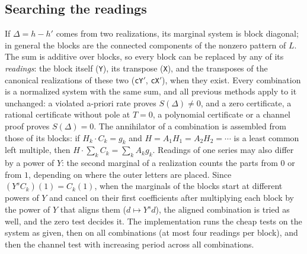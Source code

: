 \documentclass[11pt,a4paper]{article}
\theoremstyle{plain}
\theoremstyle{definition}
\theoremstyle{remark}
\begin{document}
\subsection{Searching the readings}\label{sec:search}
If $\Delta=h-h'$ comes from two realizations, its marginal system is block
diagonal; in general the blocks are the connected components of the nonzero
pattern of $L$. The sum is additive over blocks, so every block can be replaced
by any of its \emph{readings}: the block itself (\texttt{Y}), its transpose
(\texttt{X}), and the transposes of the canonical realizations of these two
(\texttt{cY$'$}, \texttt{cX$'$}), when they exist. Every combination is a
normalized system with the same sum, and all previous methods apply to it
unchanged: a violated a-priori rate proves $S(\Delta)\ne0$, and a zero
certificate, a rational certificate without pole at $T=0$, a polynomial
certificate or a channel proof proves $S(\Delta)=0$.
The annihilator of a combination is assembled from those of its blocks: if
$H_k\cdot C_k=g_k$ and $H=A_1H_1=A_2H_2=\cdots$ is a least common left multiple,
then $H\cdot\sum_kC_k=\sum_kA_kg_k$. Readings of one series may also differ by a
power of $Y$: the second marginal of a realization counts the parts from $0$ or
from $1$, depending on where the outer letters are placed. Since
$(Y^sC_k)(1)=C_k(1)$, when the marginals of the blocks start at different powers
of $Y$ and cancel on their first coefficients after multiplying each block by
the power of $Y$ that aligns them ($d\mapsto Y^sd$), the aligned combination is
tried as well, and the zero test decides it. The implementation runs the cheap
tests on the system as given, then on all combinations (at most four readings
per block), and then the channel test with increasing period across all
combinations.
\end{document}
